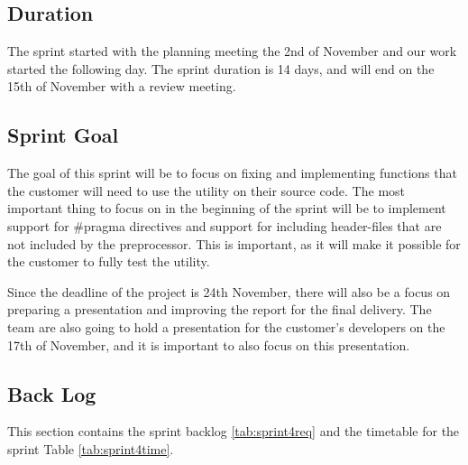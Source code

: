\subsection{Duration}
The sprint started with the planning meeting the 2nd of November and our work started the following day. The sprint duration is 14 days, and will end on the 15th of November with a review meeting. 

\subsection{Sprint Goal}
The goal of this sprint will be to focus on fixing and implementing functions that the customer will need to use the \gls{utility} on their source code. The most important thing to focus on in the beginning of the sprint will be to implement support for \#pragma directives and support for including \gls{header}-files that are not included by the \gls{preprocessor}. This is important, as it will make it possible for the customer to fully test the \gls{utility}.

Since the deadline of the project is 24th November, there will also be a focus on preparing a presentation and improving the report for the final delivery. The team are also going to hold a presentation for the customer's developers on the 17th of November, and it is important to also focus on this presentation.

\subsection{Back Log}
This section contains the sprint backlog \ref{tab:sprint4req} and the timetable for the sprint Table \ref{tab:sprint4time}.  

